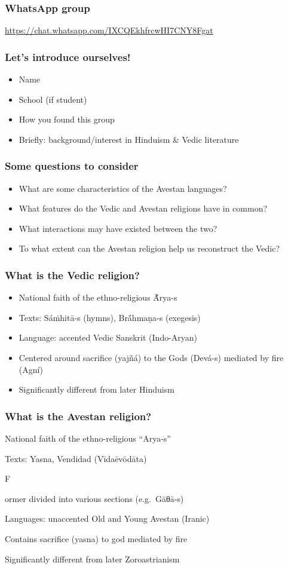 \documentclass[pdf]{beamer}
\newcommand{\Subitem}[1]{{\setlength\itemindent{12pt} \item[-] #1}}
\begin{document}
\begin{frame} \frametitle{WhatsApp group}
\begin{center}
	\href{https://chat.whatsapp.com/IXCQEkhfrcwHI7CNY8Fgat}{https://chat.whatsapp.com/IXCQEkhfrcwHI7CNY8Fgat}
\end{center}
\end{frame}

\begin{frame} \frametitle{Let's introduce ourselves!}
\begin{itemize}
	\item Name
	\item School (if student)
	\item How you found this group
	\item Briefly: background/interest in Hinduism \& Vedic literature
\end{itemize}
\end{frame}

\begin{frame}[label=questions] \frametitle{Some questions to consider}
\begin{itemize}
	\item What are some characteristics of the Avestan languages?
	\item What features do the Vedic and Avestan religions have in common?
	\item What interactions may have existed between the two?
	\item To what extent can the Avestan religion help us reconstruct the Vedic?
\end{itemize}
\end{frame}

\begin{frame} \frametitle{What is the Vedic religion?}
\begin{itemize}
	\item National faith of the ethno-religious Ā́rya-s
	\item Texts: Sáṁhitā-s (hymns), Brā́hmaṇa-s (exegesis)
	\item Language: accented Vedic Sanskrit (Indo-Aryan)
	\item Centered around sacrifice (yajñá) to the Gods (Devá-s) mediated by fire (Agní)
	\item Significantly different from later Hinduism
\end{itemize}
\end{frame}

\begin{frame} \frametitle{What is the Avestan religion?}
\begin{itemize}
	\item National faith of the ethno-religious ``Arya-s''
	\item Texts: Yasna, Vendidad (Vīdaēvōdāta)
	\Subitem Former divided into various sections (e.g.~Gāθā-s)
	\item Languages: unaccented Old and Young Avestan (Iranic)
	\item Contains sacrifice (yasna) to god mediated by fire
	\item Significantly different from later Zoroastrianism
\end{itemize}
\end{frame}
\end{document}
